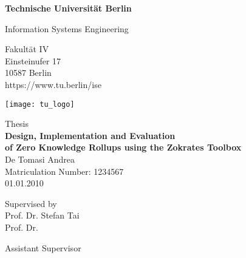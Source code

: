 \thispagestyle{empty}
\begin{center}

\vspace*{1.4cm}
{\LARGE \textbf{Technische Universität Berlin}}

\vspace{0.5cm}

{\large Information Systems Engineering\\[1mm]}

Fakultät IV\\
Einsteinufer 17\\
10587 Berlin\\
https://www.tu.berlin/ise\\

\vspace*{1cm}

\texttt{[image: tu\_logo]}

\vspace*{1.0cm}

{\LARGE Thesis}\\

\vspace{1.0cm}
{\LARGE \textbf{Design, Implementation and Evaluation}}\\
\vspace*{0.3cm}
{\LARGE \textbf{of Zero Knowledge Rollups using the Zokrates Toolbox}}\\
\vspace*{1.0cm}
{\LARGE De Tomasi Andrea}
\\
\vspace*{0.5cm}
Matriculation Number: 1234567\\
01.01.2010\\ %
\vspace*{1.0cm}

Supervised by\\
Prof. Dr. Stefan Tai\\
Prof. Dr. 

\vspace*{0.5cm}
Assistant Supervisor\\
\vspace{3cm}


\end{center}

